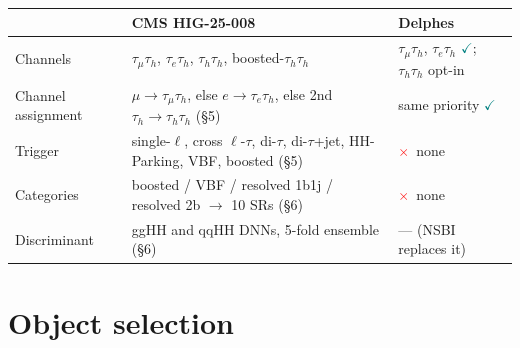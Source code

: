 \documentclass[11pt,a4paper]{article}
\newcommand{\tauh}{\tau_{h}}
\newcommand{\ok}{\textcolor{teal}{$\checkmark$}}
\newcommand{\no}{\textcolor{red}{$\times$}}
\begin{document}
\begin{table}[htbp]
\centering\small
\begin{tabular}{@{}lp{5.6cm}p{5.4cm}@{}}
\toprule
& \textbf{CMS HIG-25-008} & \textbf{Delphes} \\
\midrule
Channels & $\tau_\mu\tauh$, $\tau_e\tauh$, $\tauh\tauh$, boosted-$\tauh\tauh$
         & $\tau_\mu\tauh$, $\tau_e\tauh$ \ok; $\tauh\tauh$ opt-in \\
Channel assignment & $\mu \rightarrow \tau_\mu\tauh$, else $e \rightarrow \tau_e\tauh$,
                     else 2nd $\tauh \rightarrow \tauh\tauh$ (\S5)
                   & same priority \ok \\
Trigger & single-$\ell$, cross $\ell$-$\tau$, di-$\tau$, di-$\tau$+jet, HH-Parking,
          VBF, boosted (\S5) & \no\ none \\
Categories & boosted / VBF / resolved 1b1j / resolved 2b $\rightarrow$ 10 SRs (\S6)
           & \no\ none \\
Discriminant & ggHH and qqHH DNNs, 5-fold ensemble (\S6) & --- (NSBI replaces it) \\
\bottomrule
\end{tabular}
\end{table}

\section{Object selection}
\end{document}
